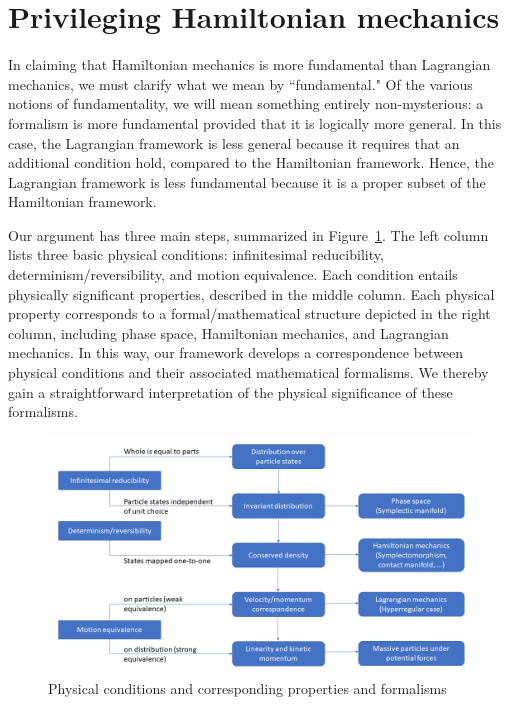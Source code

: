 \documentclass[letterpaper]{article}
\begin{document}

\section{Privileging Hamiltonian mechanics}
\label{privileging}


In claiming that Hamiltonian mechanics is more fundamental than Lagrangian mechanics, we must clarify what we mean by ``fundamental." Of the various notions of fundamentality, we will mean something entirely non-mysterious: a formalism is more fundamental provided that it is logically more general. In this case, the Lagrangian framework is less general because it requires that an additional condition hold, compared to the Hamiltonian framework. Hence, the Lagrangian framework is less fundamental because it is a proper subset of the Hamiltonian framework. 

Our argument has three main steps, summarized in Figure~\ref{diagram}. The left column lists three basic physical conditions: infinitesimal reducibility, determinism/reversibility, and motion equivalence. Each condition entails physically significant properties, described in the middle column. Each physical property corresponds to a formal/mathematical structure depicted in the right column, including phase space, Hamiltonian mechanics, and Lagrangian mechanics. In this way, our framework develops a correspondence between physical conditions and their associated mathematical formalisms. We thereby gain a straightforward interpretation of the physical significance of these formalisms.

\begin{figure}[h]
	\centering
	\includegraphics[width=\textwidth]{Diagram.png}
\caption{Physical conditions and corresponding properties and formalisms}
\label{diagram}
\end{figure}
\end{document}
